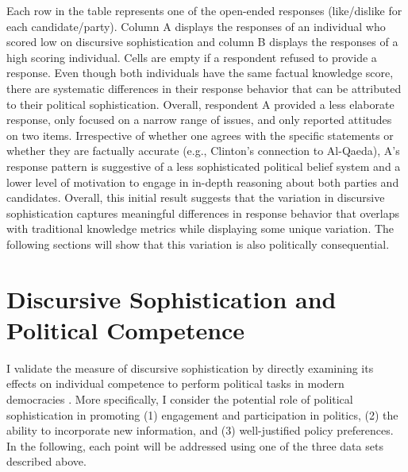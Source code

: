 Each row in the table represents one of the open-ended responses (like/dislike for each candidate/party). Column A displays the responses of an individual who scored low on discursive sophistication and column B displays the responses of a high scoring individual. Cells are empty if a respondent refused to provide a response. Even though both individuals have the same factual knowledge score, there are systematic differences in their response behavior that can be attributed to their political sophistication. Overall, respondent A provided a less elaborate response, only focused on a narrow range of issues, and only reported attitudes on two items. Irrespective of whether one agrees with the specific statements or whether they are factually accurate (e.g., Clinton's connection to Al-Qaeda), A's response pattern is suggestive of a less sophisticated political belief system and a lower level of motivation to engage in in-depth reasoning about both parties and candidates. Overall, this initial result suggests that the variation in discursive sophistication captures meaningful differences in response behavior that overlaps with traditional knowledge metrics while displaying some unique variation. The following sections will show that this variation is also politically consequential.



\section*{Discursive Sophistication and Political Competence}

I validate the measure of discursive sophistication by directly examining its effects on individual competence to perform political tasks in modern democracies \citep[cf.][]{lupia2006elitism,lupia2015uninformed}. More specifically, I consider the potential role of political sophistication in promoting (1) engagement and participation in politics, (2) the ability to incorporate new information, and (3) well-justified policy preferences. In the following, each point will be addressed using one of the three data sets described above.


